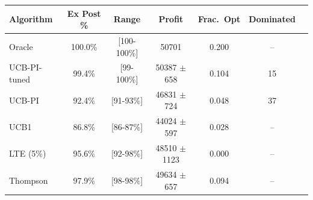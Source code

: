 \begin{tabular}{lcccccc}
\toprule
Algorithm & Ex Post \% & Range & Profit & Frac.\ Opt & Dominated \\
\midrule
Oracle & 100.0\% & [100-100\%] & 50701 & 0.200 & -- \\
UCB-PI-tuned & 99.4\% & [99-100\%] & 50387 $\pm$ 658 & 0.104 & 15 \\
UCB-PI & 92.4\% & [91-93\%] & 46831 $\pm$ 724 & 0.048 & 37 \\
UCB1 & 86.8\% & [86-87\%] & 44024 $\pm$ 597 & 0.028 & -- \\
LTE (5\%) & 95.6\% & [92-98\%] & 48510 $\pm$ 1123 & 0.000 & -- \\
Thompson & 97.9\% & [98-98\%] & 49634 $\pm$ 657 & 0.094 & -- \\
\bottomrule
\end{tabular}
